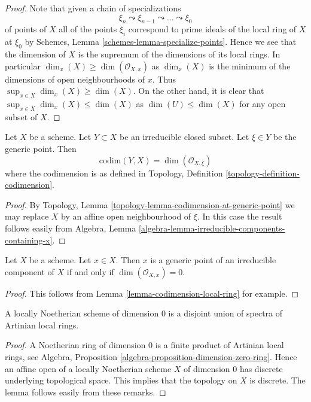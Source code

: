 \begin{proof}
Note that given a chain of specializations
$$
\xi_n \leadsto \xi_{n - 1} \leadsto \ldots \leadsto \xi_0
$$
of points of $X$ all of the points $\xi_i$ correspond to prime ideals
of the local ring of $X$ at $\xi_0$ by
Schemes, Lemma \ref{schemes-lemma-specialize-points}.
Hence we see that the dimension of $X$ is the supremum of the dimensions
of its local rings. In particular $\dim_x(X) \geq \dim(\mathcal{O}_{X, x})$
as $\dim_x(X)$ is the minimum of the dimensions of open neighbourhoods of
$x$. Thus $\sup_{x \in X} \dim_x(X) \geq \dim(X)$. On the other hand,
it is clear that $\sup_{x \in X} \dim_x(X) \leq \dim(X)$
as $\dim(U) \leq \dim(X)$ for any open subset of $X$.
\end{proof}

\begin{lemma}
\label{lemma-codimension-local-ring}
Let $X$ be a scheme. Let $Y \subset X$ be an irreducible closed
subset. Let $\xi \in Y$ be the generic point. Then
$$
\text{codim}(Y, X) = \dim(\mathcal{O}_{X, \xi})
$$
where the codimension is as defined in
Topology, Definition \ref{topology-definition-codimension}.
\end{lemma}

\begin{proof}
By Topology, Lemma \ref{topology-lemma-codimension-at-generic-point}
we may replace $X$ by an affine open neighbourhood of $\xi$. In this
case the result follows easily from
Algebra, Lemma \ref{algebra-lemma-irreducible-components-containing-x}.
\end{proof}

\begin{lemma}
\label{lemma-generic-point}
Let $X$ be a scheme. Let $x \in X$. Then $x$ is a generic point of
an irreducible component of $X$ if and only if $\dim(\mathcal{O}_{X, x}) = 0$.
\end{lemma}

\begin{proof}
This follows from Lemma \ref{lemma-codimension-local-ring} for example.
\end{proof}

\begin{lemma}
\label{lemma-locally-Noetherian-dimension-0}
A locally Noetherian scheme of dimension $0$ is a disjoint
union of spectra of Artinian local rings.
\end{lemma}

\begin{proof}
A Noetherian ring of dimension $0$ is a finite product of Artinian local
rings, see
Algebra, Proposition \ref{algebra-proposition-dimension-zero-ring}.
Hence an affine open of a locally Noetherian scheme $X$ of dimension
$0$ has discrete underlying topological space. This implies that
the topology on $X$ is discrete. The lemma follows easily from these
remarks.
\end{proof}





